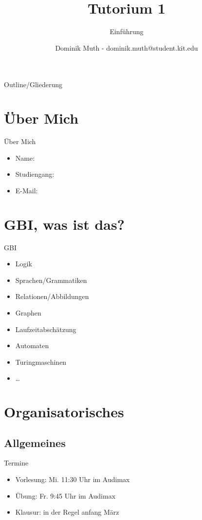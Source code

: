 \documentclass[18pt]{beamer}
\title[Einf\"uhrung]{Tutorium 1}
\subtitle{Einf\"uhrung}
\author{Dominik Muth - dominik.muth@student.kit.edu}
\institute{Institut f\"ur Informatik}
\begin{document}

\begin{frame}
	\titlepage
\end{frame}

\begin{frame}{Outline/Gliederung}
	\tableofcontents
\end{frame}

\section{\"Uber Mich}
	\begin{frame}{\"Uber Mich}
		\begin{itemize}
			\item Name: \cite{Dominik Muth} %
			\item Studiengang: \cite{Informatik} %
			\item E-Mail: \cite{dominik.muth@student.kit.edu} %
		\end{itemize}
	\end{frame}

\section{GBI, was ist das?}
	\begin{frame}{GBI}
		\begin{itemize}
			\item Logik
			\pause
			\item Sprachen/Grammatiken
			\pause
			\item Relationen/Abbildungen
			\pause
			\item Graphen
			\pause
			\item Laufzeitabsch\"atzung
			\pause
			\item Automaten
			\pause
			\item Turingmaschinen
			\item \dots
		\end{itemize}
	\end{frame}


\section{Organisatorisches}
\subsection{Allgemeines}
	\begin{frame}{Termine}
		\begin{itemize}
			\item Vorlesung: Mi. 11:30 Uhr im Audimax
			\item \"Ubung: Fr. 9:45 Uhr im Audimax
			\item Klausur: in der Regel anfang M\"arz
		\end{itemize}
	\end{frame}
\end{document}
